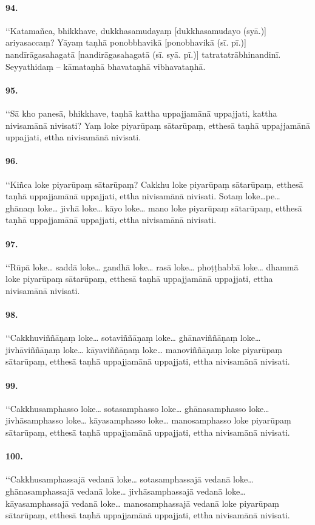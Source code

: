 \paragraph{94.} ‘‘Katamañca, bhikkhave, dukkhasamudayaṃ [dukkhasamudayo (syā.)] ariyasaccaṃ? Yāyaṃ taṇhā ponobbhavikā [ponobhavikā (sī. pī.)] nandīrāgasahagatā [nandirāgasahagatā (sī. syā. pī.)] tatratatrābhinandinī. Seyyathidaṃ – kāmataṇhā bhavataṇhā vibhavataṇhā.

\paragraph{95.} ‘‘Sā kho panesā, bhikkhave, taṇhā kattha uppajjamānā uppajjati, kattha nivisamānā nivisati? Yaṃ loke piyarūpaṃ sātarūpaṃ, etthesā taṇhā uppajjamānā uppajjati, ettha nivisamānā nivisati.

\paragraph{96.} ‘‘Kiñca loke piyarūpaṃ sātarūpaṃ? Cakkhu loke piyarūpaṃ sātarūpaṃ, etthesā taṇhā uppajjamānā uppajjati, ettha nivisamānā nivisati. Sotaṃ loke…pe… ghānaṃ loke… jivhā loke… kāyo loke… mano loke piyarūpaṃ sātarūpaṃ, etthesā taṇhā uppajjamānā uppajjati, ettha nivisamānā nivisati.

\paragraph{97.} ‘‘Rūpā loke… saddā loke… gandhā loke… rasā loke… phoṭṭhabbā loke… dhammā loke piyarūpaṃ sātarūpaṃ, etthesā taṇhā uppajjamānā uppajjati, ettha nivisamānā nivisati.

\paragraph{98.} ‘‘Cakkhuviññāṇaṃ loke… sotaviññāṇaṃ loke… ghānaviññāṇaṃ loke… jivhāviññāṇaṃ loke… kāyaviññāṇaṃ loke… manoviññāṇaṃ loke piyarūpaṃ sātarūpaṃ, etthesā taṇhā uppajjamānā uppajjati, ettha nivisamānā nivisati.

\paragraph{99.} ‘‘Cakkhusamphasso loke… sotasamphasso loke… ghānasamphasso loke… jivhāsamphasso loke… kāyasamphasso loke… manosamphasso loke piyarūpaṃ sātarūpaṃ, etthesā taṇhā uppajjamānā uppajjati, ettha nivisamānā nivisati.

\paragraph{100.} ‘‘Cakkhusamphassajā vedanā loke… sotasamphassajā vedanā loke… ghānasamphassajā vedanā loke… jivhāsamphassajā vedanā loke… kāyasamphassajā vedanā loke… manosamphassajā vedanā loke piyarūpaṃ sātarūpaṃ, etthesā taṇhā uppajjamānā uppajjati, ettha nivisamānā nivisati.

